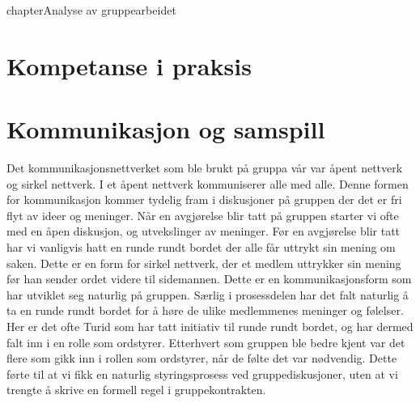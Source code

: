 
chapter{Analyse av gruppearbeidet}
\section{Kompetanse i praksis}

\section{Kommunikasjon og samspill}
Det kommunikasjonsnettverket som ble brukt på gruppa vår var åpent nettverk og sirkel nettverk. I et åpent nettverk kommuniserer alle med alle. Denne formen for kommunikasjon kommer tydelig fram i diskusjoner på gruppen der det er fri flyt av ideer og meninger. Når en avgjørelse blir tatt på gruppen starter vi ofte med en åpen diskusjon, og utvekslinger av meninger. Før en avgjørelse blir tatt har vi vanligvis hatt en runde rundt bordet der alle får uttrykt sin mening om saken. Dette er en form for sirkel nettverk, der et medlem uttrykker sin mening før han sender ordet videre til sidemannen. Dette er en kommunikasjonsform som har utviklet seg naturlig på gruppen. Særlig i prosessdelen har det falt naturlig å ta en runde rundt bordet for å høre de ulike medlemmenes meninger og følelser. Her er det ofte Turid som har tatt initiativ til runde rundt bordet, og har dermed falt inn i en rolle som ordstyrer. Etterhvert som gruppen ble bedre kjent var det flere som gikk inn i rollen som ordstyrer, når de følte det var nødvendig. Dette førte til at vi fikk en naturlig styringsprosess ved gruppediskusjoner, uten at vi trengte å skrive en formell regel i gruppekontrakten.

